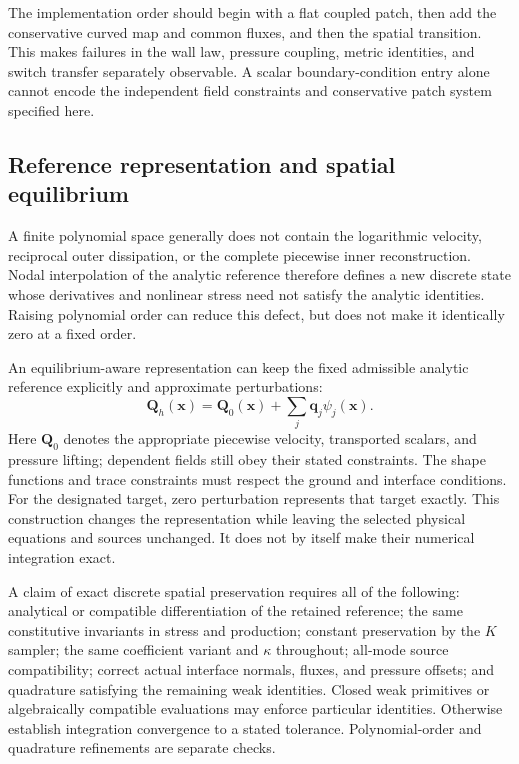 \documentclass[11pt,a4paper]{article}
\numberwithin{equation}{section}
\begin{document}
The implementation order should begin with a flat coupled patch,
then add the conservative curved map and common fluxes, and then
the spatial transition.  This makes failures in the wall law,
pressure coupling, metric identities, and switch transfer separately
observable.  A scalar boundary-condition entry alone cannot encode
the independent field constraints and conservative patch system
specified here.

\subsection{Reference representation and spatial equilibrium}
\label{num:reference-representation}

A finite polynomial space generally does not contain the
logarithmic velocity, reciprocal outer dissipation, or the complete
piecewise inner reconstruction.  Nodal interpolation of the analytic
reference therefore defines a new discrete state whose derivatives
and nonlinear stress need not satisfy the analytic identities.
Raising polynomial order can reduce this defect, but does not make
it identically zero at a fixed order.

An equilibrium-aware representation can keep the fixed admissible
analytic reference explicitly and approximate perturbations:
\begin{equation}
 \boldsymbol Q_h(\boldsymbol x)
 =\boldsymbol Q_0(\boldsymbol x)
  +\sum_j\boldsymbol q_j\psi_j(\boldsymbol x).
 \label{num:reference-lifting}
\end{equation}
Here $\boldsymbol Q_0$ denotes the appropriate piecewise velocity,
transported scalars, and pressure lifting; dependent fields still
obey their stated constraints.  The shape functions and trace
constraints must respect the ground and interface conditions.
For the designated target, zero perturbation represents that target
exactly.  This construction changes the representation while
leaving the selected physical equations and sources unchanged.
It does not by itself make their numerical integration exact.

A claim of exact discrete spatial preservation requires all of the
following: analytical or compatible differentiation of the retained
reference; the same constitutive invariants in stress and production;
constant preservation by the $K$ sampler; the same coefficient
variant and $\kappa$ throughout; all-mode source compatibility;
correct actual interface normals, fluxes, and pressure offsets;
and quadrature satisfying the remaining weak identities.  Closed
weak primitives or algebraically compatible evaluations may enforce
particular identities.  Otherwise establish integration convergence
to a stated tolerance.  Polynomial-order and quadrature refinements
are separate checks.
\end{document}
